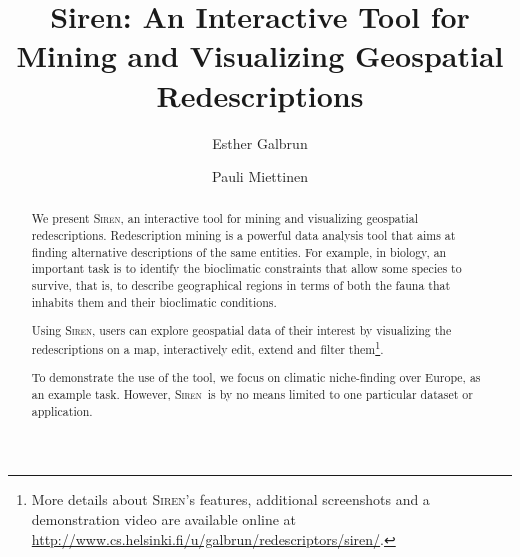 \documentclass{llncs}
\renewcommand{\note}[1]{{\color{red}{#1}\par}}
\newcommand{\Siren}{\textsc{Siren}}
\begin{document}
\title{Siren: An Interactive Tool for Mining and Visualizing Geospatial Redescriptions}

\author{
Esther Galbrun
\and
Pauli Miettinen
}

 
\maketitle
\begin{abstract}
  \note{re-write}
  We present \Siren, an interactive tool for mining and visualizing
  geospatial redescriptions.  Redescription mining is a powerful data
  analysis tool that aims at finding alternative descriptions of the
  same entities.  For example, in biology, an important task is to
  identify the bioclimatic constraints that allow some species to
  survive, that is, to describe geographical regions in terms of both
  the fauna that inhabits them and their bioclimatic conditions.
  
  Using \Siren, users can explore geospatial data of their interest by
  visualizing the redescriptions on a map, interactively edit, extend
  and filter them\footnote{More details about \Siren's features,
    additional screenshots and a demonstration video are available
    online at
    \url{http://www.cs.helsinki.fi/u/galbrun/redescriptors/siren/}.}.

  To demonstrate the use of the tool, we focus on climatic
  niche-finding over Europe, as an example task. However, \Siren\ is by
  no means limited to one particular dataset or application.
\end{abstract}
\end{document}
